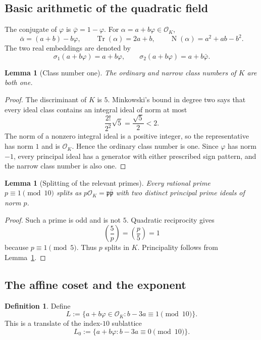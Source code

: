 \documentclass[12pt]{amsart}
\newtheorem{lemma}[theorem]{Lemma}
\theoremstyle{definition}
\newtheorem{definition}[theorem]{Definition}
\theoremstyle{remark}
\DeclareMathOperator{\N}{N}
\DeclareMathOperator{\Tr}{Tr}
\newcommand{\OK}{\mathcal{O}_K}
\newcommand{\ph}{\varphi}
\begin{document}
\subsection{Basic arithmetic of the quadratic field}

The conjugate of $\ph$ is $\bar\ph=1-\ph$.  For
$\alpha=a+b\ph\in\OK$,
\[
  \bar\alpha=(a+b)-b\ph,
  \qquad
  \Tr(\alpha)=2a+b,
  \qquad
  \N(\alpha)=a^2+ab-b^2.
\]
The two real embeddings are denoted by
\[
  \sigma_1(a+b\ph)=a+b\ph,
  \qquad
  \sigma_2(a+b\ph)=a+b\bar\ph.
\]

\begin{lemma}[Class number one]\label{lem:class-number-one}
The ordinary and narrow class numbers of $K$ are both one.
\end{lemma}

\begin{proof}
The discriminant of $K$ is $5$.  Minkowski's bound in degree two says
that every ideal class contains an integral ideal of norm at most
\[
  \frac{2!}{2^2}\sqrt5=\frac{\sqrt5}{2}<2.
\]
The norm of a nonzero integral ideal is a positive integer, so the
representative has norm $1$ and is $\OK$.  Hence the ordinary class
number is one.  Since $\ph$ has norm $-1$, every principal ideal has a
generator with either prescribed sign pattern, and the narrow class
number is also one.
\end{proof}

\begin{lemma}[Splitting of the relevant primes]\label{lem:splitting}
Every rational prime $p\equiv1\pmod{10}$ splits as
$p\OK=\mathfrak p\bar{\mathfrak p}$ with two distinct principal prime
ideals of norm $p$.
\end{lemma}

\begin{proof}
Such a prime is odd and is not $5$.  Quadratic reciprocity gives
\[
  \left(\frac{5}{p}\right)=\left(\frac{p}{5}\right)=1
\]
because $p\equiv1\pmod5$.  Thus $p$ splits in $K$.  Principality
follows from Lemma~\ref{lem:class-number-one}.
\end{proof}

\subsection{The affine coset and the exponent}

\begin{definition}\label{def:L}
Define
\[
  L:=\{a+b\ph\in\OK:b-3a\equiv1\pmod{10}\}.
\]
This is a translate of the index-$10$ sublattice
\[
  L_0:=\{a+b\ph:b-3a\equiv0\pmod{10}\}.
\]
\end{definition}
\end{document}
